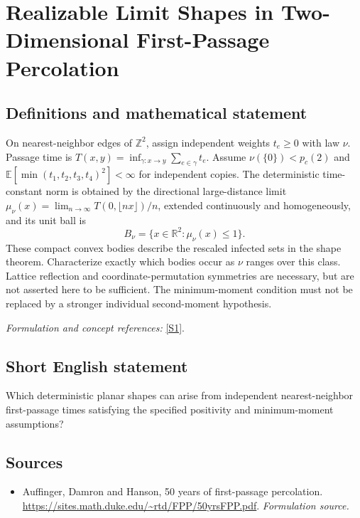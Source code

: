 \documentclass[11pt]{article}
\begin{document}
\section*{\texorpdfstring{Realizable Limit Shapes in Two-Dimensional First-Passage Percolation}{Realizable Limit Shapes in Two-Dimensional First-Passage Percolation}}\label{422}
\subsection{Definitions and mathematical statement}
On nearest-neighbor edges of ${\mathbb{Z}}^2$, assign independent weights $t_e\ge0$ with law $\nu$. Passage time is $T(x,y)=\inf_{\gamma:x\to y}\sum_{e\in\gamma}t_e$. Assume $\nu(\{0\})<p_c(2)$ and ${\mathbb{E}}[\min(t_1,t_2,t_3,t_4)^2]<\infty$ for independent copies. The deterministic time-constant norm is obtained by the directional large-distance limit $\mu_\nu(x)=\lim_{n\to\infty}T(0,\lfloor nx\rfloor)/n$, extended continuously and homogeneously, and its unit ball is
\[
 B_\nu=\{x\in{\mathbb{R}}^2:\mu_\nu(x)\le1\}.
\]
These compact convex bodies describe the rescaled infected sets in the shape theorem. Characterize exactly which bodies occur as $\nu$ ranges over this class. Lattice reflection and coordinate-permutation symmetries are necessary, but are not asserted here to be sufficient. The minimum-moment condition must not be replaced by a stronger individual second-moment hypothesis.
\par\smallskip\textit{Formulation and concept references:} \href{https://sites.math.duke.edu/~rtd/FPP/50yrsFPP.pdf}{[S1]}.

\subsection{Short English statement}
Which deterministic planar shapes can arise from independent nearest-neighbor first-passage times satisfying the specified positivity and minimum-moment assumptions?
\subsection{Sources}
\begin{itemize}
\item[S1]Auffinger, Damron and Hanson, 50 years of first-passage percolation.
\url{https://sites.math.duke.edu/~rtd/FPP/50yrsFPP.pdf}.
\textit{Formulation source.}
\end{itemize}
\end{document}
